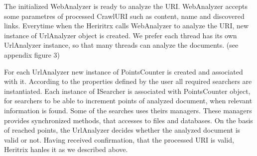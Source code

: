 \documentclass[11pt,a4paper]{article}
\begin{document}

The initialized WebAnalyzer is ready to analyze the URI. WebAnalyzer accepts some parametres of processed CrawlURI such as content, name and discovered links. Everytime when the Heriritrx calls WebAnalyzer to analyze the URI, new instance of UrlAnalyzer object is created. We prefer each thread has its own UrlAnalyzer instance, so that many threads can analyze the documents. (see appendix figure 3)

For each UrlAnalyzer new instance of PointsCounter is created and associated with it. According to the properties defined by the user all required searchers are instantiated. Each instance of ISearcher is associated with PointsCounter object, for searchers to be able to increment points of analyzed document, when relevant information is found. Some of the searches uses theirs managers. These managers provides synchronized methods, that accesses to files and databases. On the basis of reached points, the UrlAnalyzer decides whether the analyzed document is valid or not. Having received confirmation, that the processed URI is valid, Heritrix hanles it as we described above.
\end{document}
